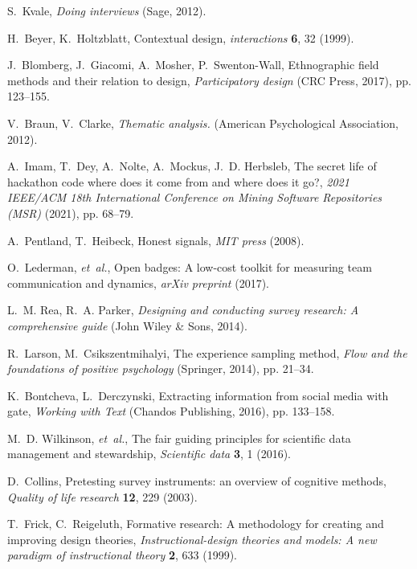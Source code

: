 \documentclass{ieeeaccess}
\begin{document}
\begin{thebibliography}{10}
S.~Kvale, {\it Doing interviews\/} (Sage, 2012).

H.~Beyer, K.~Holtzblatt, Contextual design, {\it interactions\/} {\bf 6}, 32
  (1999).

J.~Blomberg, J.~Giacomi, A.~Mosher, P.~Swenton-Wall, Ethnographic field methods
  and their relation to design, {\it Participatory design\/} (CRC Press, 2017),
  pp. 123--155.

V.~Braun, V.~Clarke, {\it Thematic analysis.\/} (American Psychological
  Association, 2012).

A.~Imam, T.~Dey, A.~Nolte, A.~Mockus, J.~D. Herbsleb, The secret life of
  hackathon code where does it come from and where does it go?, {\it 2021
  IEEE/ACM 18th International Conference on Mining Software Repositories
  (MSR)\/} (2021), pp. 68--79.

A.~Pentland, T.~Heibeck, Honest signals, {\it MIT press\/}  (2008).

O.~Lederman, {\it et~al.\/}, Open badges: A low-cost toolkit for measuring team
  communication and dynamics, {\it arXiv preprint\/}  (2017).

L.~M. Rea, R.~A. Parker, {\it Designing and conducting survey research: A
  comprehensive guide\/} (John Wiley \& Sons, 2014).

R.~Larson, M.~Csikszentmihalyi, The experience sampling method, {\it Flow and
  the foundations of positive psychology\/} (Springer, 2014), pp. 21--34.

K.~Bontcheva, L.~Derczynski, Extracting information from social media with
  gate, {\it Working with Text\/} (Chandos Publishing, 2016), pp. 133--158.

M.~D. Wilkinson, {\it et~al.\/}, The fair guiding principles for scientific
  data management and stewardship, {\it Scientific data\/} {\bf 3}, 1 (2016).

D.~Collins, Pretesting survey instruments: an overview of cognitive methods,
  {\it Quality of life research\/} {\bf 12}, 229 (2003).

T.~Frick, C.~Reigeluth, Formative research: A methodology for creating and
  improving design theories, {\it Instructional-design theories and models: A
  new paradigm of instructional theory\/} {\bf 2}, 633 (1999).


\end{thebibliography}
\end{document}
